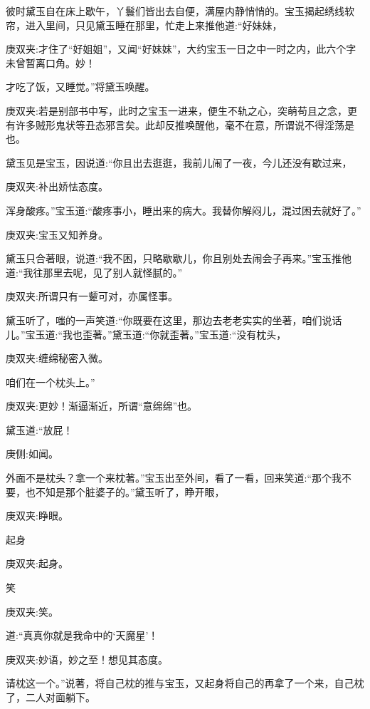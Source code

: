 \begin{parag}
    彼时黛玉自在床上歇午，丫鬟们皆出去自便，满屋内静悄悄的。宝玉揭起绣线软帘，进入里间，只见黛玉睡在那里，忙走上来推他道:“好妹妹，\begin{note}庚双夹:才住了“好姐姐”，又闻“好妹妹”，大约宝玉一日之中一时之内，此六个字未曾暂离口角。妙！\end{note}才吃了饭，又睡觉。”将黛玉唤醒。\begin{note}庚双夹:若是别部书中写，此时之宝玉一进来，便生不轨之心，突萌苟且之念，更有许多贼形鬼状等丑态邪言矣。此却反推唤醒他，毫不在意，所谓说不得淫荡是也。\end{note}黛玉见是宝玉，因说道:“你且出去逛逛，我前儿闹了一夜，今儿还没有歇过来，\begin{note}庚双夹:补出娇怯态度。\end{note}浑身酸疼。”宝玉道:“酸疼事小，睡出来的病大。我替你解闷儿，混过困去就好了。”\begin{note}庚双夹:宝玉又知养身。\end{note}黛玉只合著眼，说道:“我不困，只略歇歇儿，你且别处去闹会子再来。”宝玉推他道:“我往那里去呢，见了别人就怪腻的。”\begin{note}庚双夹:所谓只有一颦可对，亦属怪事。\end{note}
\end{parag}


\begin{parag}
    黛玉听了，嗤的一声笑道:“你既要在这里，那边去老老实实的坐著，咱们说话儿。”宝玉道:“我也歪著。”黛玉道:“你就歪著。”宝玉道:“没有枕头，\begin{note}庚双夹:缠绵秘密入微。\end{note}咱们在一个枕头上。”\begin{note}庚双夹:更妙！渐逼渐近，所谓“意绵绵”也。\end{note}黛玉道:“放屁！\begin{note}庚侧:如闻。\end{note}外面不是枕头？拿一个来枕著。”宝玉出至外间，看了一看，回来笑道:“那个我不要，也不知是那个脏婆子的。”黛玉听了，睁开眼，\begin{note}庚双夹:睁眼。\end{note}起身\begin{note}庚双夹:起身。\end{note}笑\begin{note}庚双夹:笑。\end{note}道:“真真你就是我命中的‘天魔星’！\begin{note}庚双夹:妙语，妙之至！想见其态度。\end{note}请枕这一个。”说著，将自己枕的推与宝玉，又起身将自己的再拿了一个来，自己枕了，二人对面躺下。
\end{parag}


